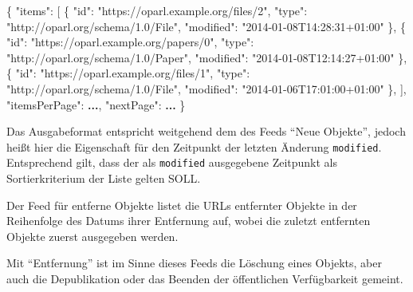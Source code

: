 \documentclass[,a4paper]{article}
\newenvironment{Shaded}{}{}
\newcommand{\DataTypeTok}[1]{\textcolor[rgb]{0.56,0.13,0.00}{{#1}}}
\newcommand{\StringTok}[1]{\textcolor[rgb]{0.25,0.44,0.63}{{#1}}}
\newcommand{\OtherTok}[1]{\textcolor[rgb]{0.00,0.44,0.13}{{#1}}}
\newcommand{\FunctionTok}[1]{\textcolor[rgb]{0.02,0.16,0.49}{{#1}}}
\newcommand{\ErrorTok}[1]{\textcolor[rgb]{1.00,0.00,0.00}{\textbf{{#1}}}}
\begin{document}
\begin{Shaded}
\begin{Highlighting}[]
\FunctionTok{\{}
    \DataTypeTok{"items"}\FunctionTok{:} \OtherTok{[}
        \FunctionTok{\{}
            \DataTypeTok{"id"}\FunctionTok{:} \StringTok{"https://oparl.example.org/files/2"}\FunctionTok{,}
            \DataTypeTok{"type"}\FunctionTok{:} \StringTok{"http://oparl.org/schema/1.0/File"}\FunctionTok{,}
            \DataTypeTok{"modified"}\FunctionTok{:} \StringTok{"2014-01-08T14:28:31+01:00"}
        \FunctionTok{\}}\OtherTok{,}
        \FunctionTok{\{}
            \DataTypeTok{"id"}\FunctionTok{:} \StringTok{"https://oparl.example.org/papers/0"}\FunctionTok{,}
            \DataTypeTok{"type"}\FunctionTok{:} \StringTok{"http://oparl.org/schema/1.0/Paper"}\FunctionTok{,}
            \DataTypeTok{"modified"}\FunctionTok{:} \StringTok{"2014-01-08T12:14:27+01:00"}
        \FunctionTok{\}}\OtherTok{,}
        \FunctionTok{\{}
            \DataTypeTok{"id"}\FunctionTok{:} \StringTok{"https://oparl.example.org/files/1"}\FunctionTok{,}
            \DataTypeTok{"type"}\FunctionTok{:} \StringTok{"http://oparl.org/schema/1.0/File"}\FunctionTok{,}
            \DataTypeTok{"modified"}\FunctionTok{:} \StringTok{"2014-01-06T17:01:00+01:00"}
        \FunctionTok{\}}\OtherTok{,}
    \OtherTok{]}\FunctionTok{,}
    \DataTypeTok{"itemsPerPage"}\FunctionTok{:} \ErrorTok{...}\FunctionTok{,}
    \DataTypeTok{"nextPage"}\FunctionTok{:} \ErrorTok{...}
\FunctionTok{\}}
\end{Highlighting}
\end{Shaded}

Das Ausgabeformat entspricht weitgehend dem des Feeds ``Neue Objekte'',
jedoch heißt hier die Eigenschaft für den Zeitpunkt der letzten Änderung
\texttt{modified}. Entsprechend gilt, dass der als \texttt{modified}
ausgegebene Zeitpunkt als Sortierkriterium der Liste gelten SOLL.


Der Feed für entferne Objekte listet die URLs entfernter Objekte in der
Reihenfolge des Datums ihrer Entfernung auf, wobei die zuletzt
entfernten Objekte zuerst ausgegeben werden.

Mit ``Entfernung'' ist im Sinne dieses Feeds die Löschung eines Objekts,
aber auch die Depublikation oder das Beenden der öffentlichen
Verfügbarkeit gemeint.
\end{document}
